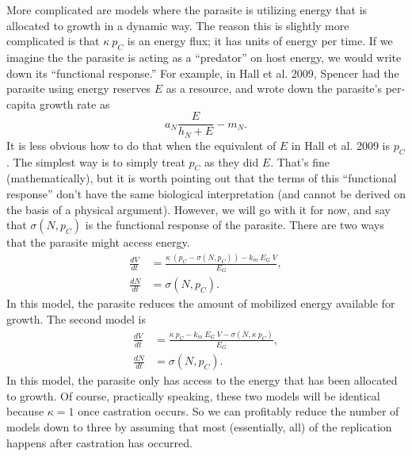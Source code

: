 \documentclass[11pt,reqno,final,pdftex]{amsart}\usepackage[]{graphicx}\usepackage[]{color}
\theoremstyle{plain}
\numberwithin{equation}{part}
\begin{document}
More complicated are models where the parasite is utilizing energy that is allocated to growth in a dynamic way.
The reason this is slightly more complicated is that $\kappa~p_C$ is an energy flux; it has units of energy per time.
If we imagine the the parasite is acting as a ``predator'' on host energy, we would write down its ``functional response.''
For example, in Hall et al. 2009, Spencer had the parasite using energy reserves $E$ as a resource, and wrote down the parasite's per-capita growth rate as
\begin{equation}
a_N \frac{E}{h_N+E}-m_N.
\end{equation}
It is less obvious how to do that when the equivalent of $E$ in Hall et al. 2009 is $p_C$.
The simplest way is to simply treat $p_C$ as they did $E$.
That's fine (mathematically), but it is worth pointing out that the terms of this ``functional response'' don't have the same biological interpretation (and cannot be derived on the basis of a physical argument).
However, we will go with it for now, and say that $\sigma(N,p_C)$ is the functional response of the parasite.
There are two ways that the parasite might access energy.
\begin{align}
\frac{dV}{dt} &= \frac{\kappa~(p_C - \sigma(N,p_C)) - k_m~E_G~V}{E_G}, \\
\frac{dN}{dt} &= \sigma(N,p_C).
\end{align}
In this model, the parasite reduces the amount of mobilized energy available for growth.
The second model is
\begin{align}
\frac{dV}{dt} &= \frac{\kappa~p_C - k_m~E_G~V - \sigma(N,\kappa~p_C)}{E_G}, \\
\frac{dN}{dt} &= \sigma(N,p_C).
\end{align}
In this model, the parasite only has access to the energy that has been allocated to growth.
Of course, practically speaking, these two models will be identical because $\kappa=1$ once castration occurs.
So we can profitably reduce the number of models down to three by assuming that most (essentially, all) of the replication happens after castration has occurred.
\end{document}
